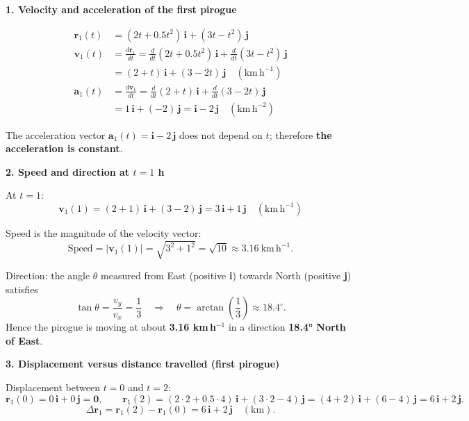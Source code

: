 \documentclass[11pt]{article}
\newcounter{popsec}
\newcounter{popsub}
\newcommand{\courssub}[1]{%
  \stepcounter{popsub}%
  \par\vspace{9pt}\noindent{\popxbold\fontsize{11.5}{13}\selectfont\color{popink}{\color{poporange}\thepopsec.\thepopsub}\hspace{6pt}#1}\par\nopagebreak\vspace{4pt}
}
\begin{document}
\courssub{Model answer}
\begin{exemplebox}

\textbf{1. Velocity and acceleration of the first pirogue}

\begin{align*}
\mathbf{r}_1(t) &= (2t + 0.5t^2)\,\mathbf{i} + (3t - t^2)\,\mathbf{j} \\[4pt]
\mathbf{v}_1(t) &= \frac{d\mathbf{r}_1}{dt} = \frac{d}{dt}(2t + 0.5t^2)\,\mathbf{i} + \frac{d}{dt}(3t - t^2)\,\mathbf{j} \\
                &= (2 + t)\,\mathbf{i} + (3 - 2t)\,\mathbf{j} \quad (\mathrm{km\,h^{-1}}) \\[4pt]
\mathbf{a}_1(t) &= \frac{d\mathbf{v}_1}{dt} = \frac{d}{dt}(2 + t)\,\mathbf{i} + \frac{d}{dt}(3 - 2t)\,\mathbf{j} \\
                &= 1\,\mathbf{i} + (-2)\,\mathbf{j} = \mathbf{i} - 2\,\mathbf{j} \quad (\mathrm{km\,h^{-2}})
\end{align*}

The acceleration vector $\mathbf{a}_1(t) = \mathbf{i} - 2\,\mathbf{j}$ does not depend on $t$; therefore \textbf{the acceleration is constant}.

\vspace{4pt}
\textbf{2. Speed and direction at $t=1$ h}

At $t=1$:
\[
\mathbf{v}_1(1) = (2+1)\,\mathbf{i} + (3-2)\,\mathbf{j} = 3\,\mathbf{i} + 1\,\mathbf{j} \quad (\mathrm{km\,h^{-1}})
\]

Speed is the magnitude of the velocity vector:
\[
\text{Speed} = |\mathbf{v}_1(1)| = \sqrt{3^2 + 1^2} = \sqrt{10} \approx 3.16\ \mathrm{km\,h^{-1}}.
\]

Direction: the angle $\theta$ measured from East (positive \textbf{i}) towards North (positive \textbf{j}) satisfies
\[
\tan\theta = \frac{v_y}{v_x} = \frac{1}{3} \quad\Rightarrow\quad \theta = \arctan\left(\frac{1}{3}\right) \approx 18.4^\circ.
\]
Hence the pirogue is moving at about \textbf{3.16 km\,h$^{-1}$} in a direction \textbf{18.4° North of East}.

\vspace{4pt}
\textbf{3. Displacement versus distance travelled (first pirogue)}

Displacement between $t=0$ and $t=2$:
\[
\mathbf{r}_1(0) = 0\,\mathbf{i} + 0\,\mathbf{j} = \mathbf{0}, \qquad
\mathbf{r}_1(2) = (2\cdot2 + 0.5\cdot4)\,\mathbf{i} + (3\cdot2 - 4)\,\mathbf{j} = (4+2)\,\mathbf{i} + (6-4)\,\mathbf{j} = 6\,\mathbf{i} + 2\,\mathbf{j}.
\]
\[
\Delta\mathbf{r}_1 = \mathbf{r}_1(2) - \mathbf{r}_1(0) = 6\,\mathbf{i} + 2\,\mathbf{j} \quad (\mathrm{km}).
\]


\end{exemplebox}
\end{document}

